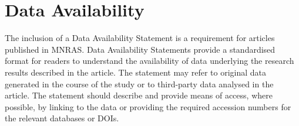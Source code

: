 \documentclass[fleqn,usenatbib]{mnras}
\begin{document}
{\section*{Data Availability}

The inclusion of a Data Availability Statement is a requirement for articles published in MNRAS.
Data Availability Statements provide a standardised format for readers to understand the availability
of data underlying the research results described in the article. The statement may refer to original
data generated in the course of the study or to third-party data analysed in the article.
The statement should describe and provide means of access, where possible, by linking to the
data or providing the required accession numbers for the relevant databases or DOIs.










\appendix
}
\end{document}
